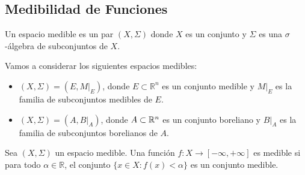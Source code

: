 \subsection{Medibilidad de Funciones}

\label{Espacio medible}
\begin{definición}
Un espacio medible es un par $(X, \Sigma)$ donde $X$ es un conjunto y $\Sigma$ es una $\sigma$-álgebra de subconjuntos de $X$.
\end{definición}
Vamos a considerar los siguientes espacios medibles:

\begin{itemize}
    \item $(X, \Sigma) = (E, M|_E)$, donde $E \subset \mathbb{R}^n$ es un conjunto medible y $M|_E$ es la familia de subconjuntos medibles de $E$.
    \item $(X, \Sigma) = (A, B|_A)$, donde $A \subset \mathbb{R}^n$ es un conjunto boreliano y $B|_A$ es la familia de subconjuntos borelianos de $A$.
\end{itemize}

\label{Función medible}
\begin{definición}
Sea $(X, \Sigma)$ un espacio medible. Una función $f: X \to [-\infty, +\infty]$ es medible si para todo $\alpha \in \mathbb{R}$, el conjunto $\{x \in X : f(x) < \alpha\}$ es un conjunto medible.
\end{definición}


